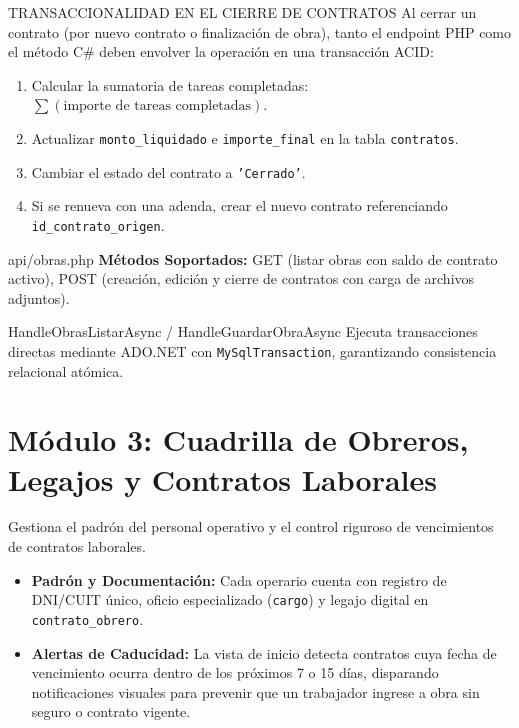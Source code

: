 \documentclass[11pt,a4paper,openany]{report}
\begin{document}
\begin{tipbox}{TRANSACCIONALIDAD EN EL CIERRE DE CONTRATOS}
    Al cerrar un contrato (por nuevo contrato o finalización de obra), tanto el endpoint PHP como el método C\# deben envolver la operación en una transacción ACID:
    \begin{enumerate}[leftmargin=1.2em]
        \item Calcular la sumatoria de tareas completadas: $\sum(\text{importe de tareas completadas})$.
        \item Actualizar \texttt{monto\_liquidado} e \texttt{importe\_final} en la tabla \texttt{contratos}.
        \item Cambiar el estado del contrato a \texttt{'Cerrado'}.
        \item Si se renueva con una adenda, crear el nuevo contrato referenciando \texttt{id\_contrato\_origen}.
    \end{enumerate}
\end{tipbox}

\begin{apibox}{api/obras.php}
    \textbf{Métodos Soportados:} GET (listar obras con saldo de contrato activo), POST (creación, edición y cierre de contratos con carga de archivos adjuntos).
\end{apibox}

\begin{methodbox}{HandleObrasListarAsync / HandleGuardarObraAsync}
    Ejecuta transacciones directas mediante ADO.NET con \texttt{MySqlTransaction}, garantizando consistencia relacional atómica.
\end{methodbox}

\electricsep

\section{Módulo 3: Cuadrilla de Obreros, Legajos y Contratos Laborales}

Gestiona el padrón del personal operativo y el control riguroso de vencimientos de contratos laborales.
\begin{itemize}[leftmargin=1.5em]
    \item \textbf{Padrón y Documentación:} Cada operario cuenta con registro de DNI/CUIT único, oficio especializado (\texttt{cargo}) y legajo digital en \texttt{contrato\_obrero}.
    \item \textbf{Alertas de Caducidad:} La vista de inicio detecta contratos cuya fecha de vencimiento ocurra dentro de los próximos 7 o 15 días, disparando notificaciones visuales para prevenir que un trabajador ingrese a obra sin seguro o contrato vigente.
\end{itemize}
\end{document}
